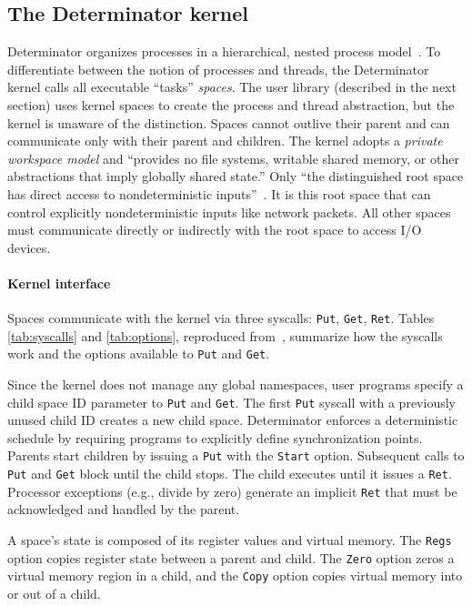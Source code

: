 \subsection{The Determinator kernel}

Determinator organizes processes in a hierarchical, nested
process model~\cite{Ford96,Aviram10}. To differentiate between the notion of
processes and threads, the Determinator kernel calls all executable ``tasks''
\emph{spaces}. The user library (described in the next section) uses kernel
spaces to create the process and thread abstraction, but the kernel is unaware
of the distinction.
Spaces cannot outlive their parent and can communicate only with their
parent and children. The kernel adopts a \emph{private workspace model} and
``provides no file systems, writable shared
memory, or other abstractions that imply globally shared state.'' Only ``the
distinguished root space has direct access to nondeterministic
inputs''~\cite{Aviram10}. It is this root space that can control explicitly
nondeterministic inputs like network packets. All other spaces must
communicate directly or indirectly with the root space to access I/O devices.




\paragraph{Kernel interface} Spaces communicate with the kernel via three
syscalls: {\tt Put}, {\tt Get}, {\tt Ret}. Tables \ref{tab:syscalls} and
\ref{tab:options}, reproduced from~\cite{Aviram10}, summarize how the syscalls
work and the options available to {\tt Put} and {\tt Get}.

Since the kernel does not manage any global namespaces, user programs specify
a child space ID parameter to {\tt Put} and {\tt Get}. The first {\tt Put}
syscall with a previously unused child ID creates a new child space.
Determinator enforces a deterministic schedule by requiring programs to
explicitly define synchronization points. Parents start children by issuing a
{\tt Put} with the {\tt Start} option. Subsequent calls to {\tt Put} and
{\tt Get} block until the child stops. The child executes until it issues a
{\tt Ret}. Processor exceptions (e.g., divide by zero) generate an implicit
{\tt Ret} that must be acknowledged and handled by the parent.

A space's state is composed of its register values and virtual memory.
The {\tt Regs} option copies register state between a parent and child.
The {\tt Zero} option zeros a virtual memory region in a child, and the
{\tt Copy} option copies virtual memory into or out of a child.

